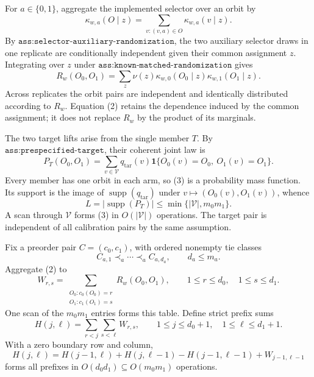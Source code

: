 For \(a\in\{0,1\}\), aggregate the implemented selector over an orbit by
\[
\kappa_{w,a}(O\mid z)=\sum_{v:(v,a)\in O}\kappa_{w,a}(v\mid z).\tag{1}
\]
By \(\texttt{ass:selector-auxiliary-randomization}\), the two auxiliary selector draws in one replicate are conditionally independent given their common assignment \(z\). Integrating over \(z\) under \(\texttt{ass:known-matched-randomization}\) gives
\[
R_w(O_0,O_1)=\sum_z\nu(z)\kappa_{w,0}(O_0\mid z)\kappa_{w,1}(O_1\mid z).\tag{2}
\]
Across replicates the orbit pairs are independent and identically distributed according to \(R_w\). Equation (2) retains the dependence induced by the common assignment; it does not replace \(R_w\) by the product of its marginals.

The two target lifts arise from the single member \(T\). By \(\texttt{ass:prespecified-target}\), their coherent joint law is
\[
P_T(O_0,O_1)=\sum_{v\in\mathcal V}q_{\mathrm{tar}}(v)\mathbf 1\{O_0(v)=O_0,\ O_1(v)=O_1\}.\tag{3}
\]
Every member has one orbit in each arm, so (3) is a probability mass function. Its support is the image of \(\operatorname{supp}(q_{\mathrm{tar}})\) under \(v\mapsto(O_0(v),O_1(v))\), whence
\[
L=|\operatorname{supp}(P_T)|\le\min\{|\mathcal V|,m_0m_1\}.\tag{4}
\]
A scan through \(\mathcal V\) forms (3) in \(O(|\mathcal V|)\) operations. The target pair is independent of all calibration pairs by the same assumption.

Fix a preorder pair \(C=(c_0,c_1)\), with ordered nonempty tie classes
\[
C_{a,1}\prec_a\cdots\prec_a C_{a,d_a},\qquad d_a\le m_a.\tag{5}
\]
Aggregate (2) to
\[
W_{r,s}=\sum_{\substack{O_0:c_0(O_0)=r\\O_1:c_1(O_1)=s}}R_w(O_0,O_1),\qquad 1\le r\le d_0,\quad 1\le s\le d_1.\tag{6}
\]
One scan of the \(m_0m_1\) entries forms this table. Define strict prefix sums
\[
H(j,\ell)=\sum_{r<j}\sum_{s<\ell}W_{r,s},\qquad 1\le j\le d_0+1,\quad 1\le\ell\le d_1+1.\tag{7}
\]
With a zero boundary row and column,
\[
H(j,\ell)=H(j-1,\ell)+H(j,\ell-1)-H(j-1,\ell-1)+W_{j-1,\ell-1}\tag{8}
\]
forms all prefixes in \(O(d_0d_1)\subseteq O(m_0m_1)\) operations.

